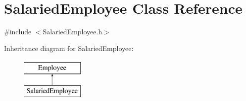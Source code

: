 \hypertarget{class_salaried_employee}{}\section{Salaried\+Employee Class Reference}
\label{class_salaried_employee}


{\ttfamily \#include $<$Salaried\+Employee.\+h$>$}

Inheritance diagram for Salaried\+Employee\+:\begin{figure}[H]
\begin{center}
\leavevmode
\includegraphics[height=2.000000cm]{class_salaried_employee}
\end{center}
\end{figure}
